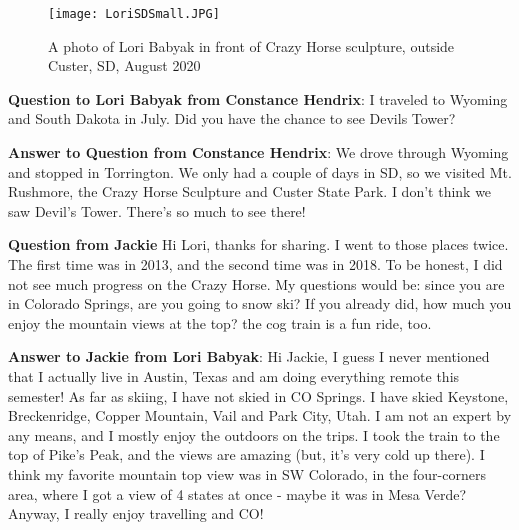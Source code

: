 \begin{figure} [h!]
    \centering
    {\texttt{[image: LoriSDSmall.JPG]}}
    \caption{A photo of Lori Babyak in front of Crazy Horse sculpture, outside Custer, SD, August 2020}
\end{figure}


\textbf{Question  to Lori Babyak from Constance Hendrix}:  I traveled to Wyoming and South Dakota in July.  Did you have the chance to see Devils Tower?

\textbf{Answer to Question from Constance Hendrix}: We drove through Wyoming and stopped in Torrington.  We only had a couple of days in SD, so we visited Mt. Rushmore, the Crazy Horse Sculpture and Custer State Park.  I don't think we saw Devil's Tower. There's so much to see there!

\textbf{Question from Jackie}
Hi Lori, thanks for sharing. I went to those places twice. The first time was in 2013, and the second time was in 2018. To be honest, I did not see much progress on the Crazy Horse. My questions would be: since you are in Colorado Springs, are you going to snow ski? If you already did, how much you enjoy the mountain views at the top? the cog train is a fun ride, too. 

\textbf{Answer to Jackie from Lori Babyak}: Hi Jackie, I guess I never mentioned that I actually live in Austin, Texas and am doing everything remote this semester! As far as skiing, I have not skied in CO Springs.  I have skied Keystone, Breckenridge, Copper Mountain, Vail and Park City, Utah. I am not an expert by any means, and I mostly enjoy the outdoors on the trips. I took the train to the top of Pike's Peak, and the views are amazing (but, it's very cold up there).  I think my favorite mountain top view was in SW Colorado, in the four-corners area, where I got a view of 4 states at once - maybe it was in Mesa Verde? Anyway, I really enjoy travelling and CO!

